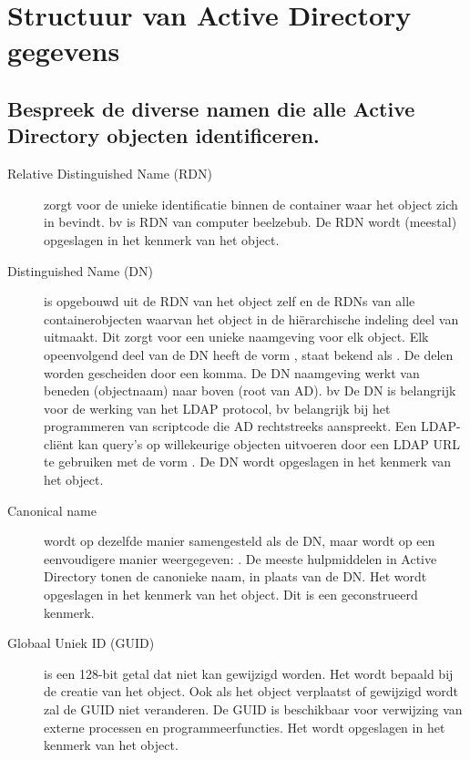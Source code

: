 \chapter{Structuur van Active Directory gegevens}

\section{Bespreek de diverse namen die alle Active Directory objecten
identificeren.}

\begin{description}
	\item[Relative Distinguished Name (RDN)] zorgt voor de unieke
		identificatie binnen de container waar het object zich in
		bevindt. bv  is RDN van computer beelzebub.
		De RDN wordt (meestal) opgeslagen in het kenmerk  van
		het object.
	\item[Distinguished Name (DN)] is opgebouwd uit de RDN van het object
		zelf en de RDNs van alle containerobjecten waarvan het object in
		de hiërarchische indeling deel van uitmaakt. Dit zorgt voor een
		unieke naamgeving voor elk object. Elk opeenvolgend deel van de
		DN heeft de vorm , staat bekend als
		. De delen worden gescheiden door een
		komma. De DN naamgeving werkt van beneden (objectnaam) naar
		boven (root van AD). bv
		De DN is belangrijk voor de werking van het LDAP protocol, bv
		belangrijk bij het programmeren van scriptcode die AD
		rechtstreeks aanspreekt. Een LDAP-cliënt kan query's op
		willekeurige objecten uitvoeren door een LDAP URL te gebruiken
		met de vorm . De DN
		wordt opgeslagen in het kenmerk  van
		het object.
	\item[Canonical name] wordt op dezelfde manier samengesteld als de DN,
		maar wordt op een eenvoudigere manier weergegeven:
		. De meeste hulpmiddelen in
		Active Directory tonen de canonieke naam, in plaats van de DN.
		Het wordt opgeslagen in het kenmerk  van
		het object. Dit is een geconstrueerd kenmerk.
	\item[Globaal Uniek ID (GUID)] is een 128-bit getal dat niet kan
		gewijzigd worden. Het wordt bepaald bij de creatie van het
		object. Ook als het object verplaatst of gewijzigd wordt zal de
		GUID niet veranderen. De GUID is beschikbaar voor verwijzing van
		externe processen en programmeerfuncties. Het wordt opgeslagen
		in het kenmerk  van het object.
\end{description}

